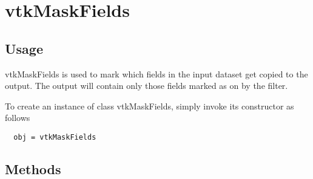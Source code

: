 \section{vtkMaskFields}

\subsection{Usage}

 vtkMaskFields is used to mark which fields in the input dataset
 get copied to the output.  The output will contain only those fields
 marked as on by the filter.

To create an instance of class vtkMaskFields, simply
invoke its constructor as follows
\begin{verbatim}
  obj = vtkMaskFields
\end{verbatim}
\subsection{Methods}

